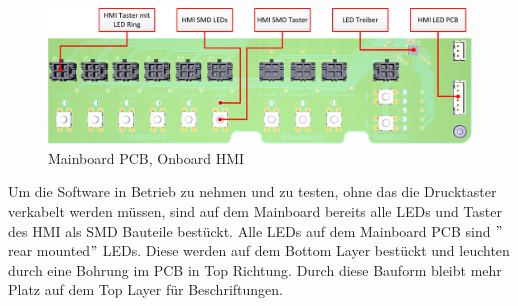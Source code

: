 \begin{figure}[H]
	\includegraphics[draft=false,width=1\textwidth]{Illustrationen/6-Umsetzung/HMI_Layout.jpg}
	\caption{Mainboard PCB, Onboard HMI}
	\label{fig:Mainboard_HMI_Layout}
\end{figure}

 Um die Software in Betrieb zu nehmen und zu testen, ohne das die Drucktaster verkabelt werden müssen, sind auf dem Mainboard bereits alle LEDs und Taster des HMI als SMD Bauteile bestückt. Alle LEDs auf dem Mainboard PCB sind $"$rear mounted$"$ LEDs. Diese werden auf dem Bottom Layer bestückt und leuchten durch eine Bohrung im PCB in Top Richtung. Durch diese Bauform bleibt mehr Platz auf dem Top Layer für Beschriftungen.




